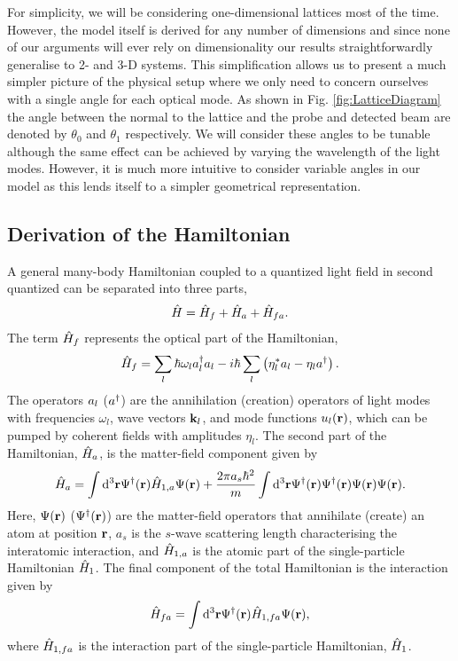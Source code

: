 For simplicity, we will be considering one-dimensional lattices most
of the time. However, the model itself is derived for any number of
dimensions and since none of our arguments will ever rely on
dimensionality our results straightforwardly generalise to 2- and 3-D
systems. This simplification allows us to present a much simpler
picture of the physical setup where we only need to concern ourselves
with a single angle for each optical mode. As shown in
Fig. \ref{fig:LatticeDiagram} the angle between the normal to the
lattice and the probe and detected beam are denoted by $\theta_0$ and
$\theta_1$ respectively. We will consider these angles to be tunable
although the same effect can be achieved by varying the wavelength of
the light modes. However, it is much more intuitive to consider
variable angles in our model as this lends itself to a simpler
geometrical representation.

\subsection{Derivation of the Hamiltonian}

A general many-body Hamiltonian coupled to a quantized light field in
second quantized can be separated into three parts,
\begin{equation}
\label{eq:FullH}
  \hat{H} = \hat{H}_f + \hat{H}_a + \hat{H}_{fa}.
\end{equation}
The term $\hat{H}_f$ represents the optical part of the Hamiltonian,
\begin{equation}
\label{eq:Hf}
  \hat{H}_f = \sum_l \hbar \omega_l a^\dagger_l a_l -
  i \hbar \sum_l \left( \eta_l^* a_l - \eta_l a^\dagger \right).
\end{equation}
The operators $a_l$ ($a^\dagger$) are the annihilation (creation) operators
of light modes with frequencies $\omega_l$, wave vectors $\mathbf{k}_l$,
and mode functions $u_l(\mathbf{r})$, which can be pumped by coherent
fields with amplitudes $\eta_l$. The second part of the Hamiltonian,
$\hat{H}_a$, is the matter-field component given by
\begin{equation}
\label{eq:Ha}
  \hat{H}_a = \int \mathrm{d}^3 \mathbf{r} \Psi^\dagger(\mathbf{r}) \hat{H}_{1,a}
  \Psi(\mathbf{r}) + \frac{2 \pi a_s \hbar^2}{m} \int \mathrm{d}^3 \mathbf{r}
  \Psi^\dagger(\mathbf{r}) \Psi^\dagger(\mathbf{r}) \Psi(\mathbf{r}) \Psi(\mathbf{r}).
\end{equation}
Here, $\Psi(\mathbf{r})$ ($\Psi^\dagger(\mathbf{r})$) are the matter-field
operators that annihilate (create) an atom at position $\mathbf{r}$, $a_s$
is the $s$-wave scattering length characterising the interatomic
interaction, and $\hat{H}_{1,a}$ is the atomic part of the single-particle
Hamiltonian $\hat{H}_1$. The final component of the total Hamiltonian is
the interaction given by 
\begin{equation}
  \label{eq:Hfa}
  \hat{H}_{fa} = \int \mathrm{d}^3 \mathbf{r} \Psi^\dagger(\mathbf{r}) \hat{H}_{1,fa}
  \Psi(\mathbf{r}),
\end{equation}
where $\hat{H}_{1,fa}$ is the interaction part of the single-particle
Hamiltonian, $\hat{H}_1$.

